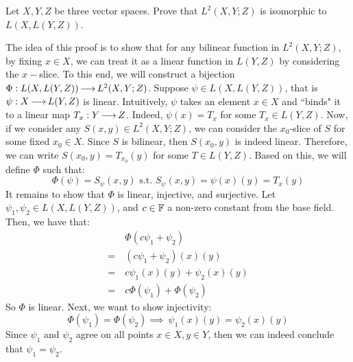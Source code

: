 \newpage
\label{q2}
\begin{qu}[num=2]
    Let $ X, Y, Z $ be three vector spaces.
    Prove that $ L^{2}(X, Y ; Z) $ is isomorphic to $ L(X, L(Y, Z)) $.
\end{qu}

\begin{soln}
    The idea of this proof is to show that for any bilinear function in
    $ L^{2}(X, Y; Z) $, by fixing $ x \in X $, we can treat it as a linear
    function in $ L(Y, Z) $ by considering the $ x- $slice.
    To this end, we will construct a bijection $ \Phi : L(X, L(Y, Z)) \operatorname{\longrightarrow}
    L^{2}(X, Y ; Z) $. \vsp
    Suppose $ \psi \in L(X, L(Y, Z)) $, that is $ \psi : X \operatorname{\longrightarrow} L(Y, Z) $
    is linear. Intuitively, $ \psi $ takes an element $ x \in X $ and ``binds" it
    to a linear map $ T_{x}: Y \operatorname{\longrightarrow} Z $.
    Indeed, $ \psi(x) = T_{x} $ for some $ T_{x} \in L(Y, Z) $. \vsp
    Now, if we consider any $ S(x, y) \in L^{2}(X, Y ; Z) $, we can consider the
    $ x_{0} $-slice of $ S $ for some fixed $ x_{0} \in X $. 
    Since $ S $ is bilinear, then $ S(x_{0}, y) $ is indeed linear.
    Therefore, we can write $ S(x_{0}, y) = T_{x_{0}}(y) $ for some $ T \in
    L(Y, Z) $. \vsp
    Based on this, we will define $ \Phi $ such that:
    \begin{equation*}
        \Phi(\psi) = S_{\psi}(x, y) \textrm{ s.t. } S_{\psi}(x, y) = \psi(x)(y)
        = T_{x}(y)
    \end{equation*}
    It remains to show that $ \Phi $ is linear, injective, and surjective. \vsp
    Let $ \psi_{1}, \psi_{2} \in L(X, L(Y, Z)) $, and $ c \in \mathbb{F} $ a non-zero
    constant from the base field. \\
    Then, we have that:
    \begin{align*}
        & \Phi(c\psi_{1} + \psi_{2}) \\
        = \ & (c\psi_{1} + \psi_{2})(x)(y) \\
        = \ & c\psi_{1}(x)(y) + \psi_{2}(x)(y) \\
        = \ & c\Phi(\psi_{1}) + \Phi(\psi_{2})
    \end{align*}
    So $ \Phi $ is linear. Next, we want to show injectivity:
    \begin{equation*}
        \Phi(\psi_{1}) = \Phi(\psi_{2}) \implies \ \psi_{1}(x)(y)=\psi_{2}(x)(y)
    \end{equation*}
    Since $ \psi_{1} $ and $ \psi_{2} $ agree on all points $ x \in X, y \in Y $,
    then we can indeed conclude that $ \psi_{1} = \psi_{2} $.

\end{soln}
